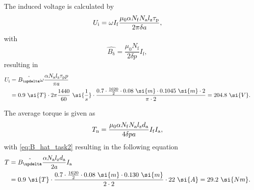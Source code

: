 
\begin{solutionblock}
    The induced voltage is calculated by
    \begin{equation}
        U_{\mathrm{i}} = \omega I_{\mathrm{f}} \frac{\mu_{\mathrm{0}} \alpha N_{\mathrm{f}} N_{\mathrm{a}} l_{\mathrm{z}} \tau_{\mathrm{p}}}{2 \pi \delta a},
    \end{equation}
    with
    \begin{equation}
        \hat{B_{\updelta}} = \frac{\mu_{\mathrm{0}} N_{\mathrm{f}}}{2 \delta p} I_{\mathrm{f}},
        \label{eq:B_hat_task2}
    \end{equation}
    resulting in
    \begin{align}
        \begin{split}
            U_{\mathrm{i}} &= \hat{B_{\updelta}} \omega \frac{\alpha N_{\mathrm{a}} \lz \taup p}{\pi a}\\
            &= 0.9 \ \si{T} \cdot 2\pi \frac{1440}{60} \ \si{\frac{1}{s}} \cdot \frac{0.7 \cdot \frac{1620}{2} \cdot 0.08 \ \si{m} \cdot 0.1045 \ \si{m} \cdot 2}{\pi \cdot 2}
            = 204.8 \ \si{V}.
        \end{split}
    \end{align}

    The average torque is given as
    \begin{equation}
        T_{\mathrm{n}}
        = \frac{\mu_{\mathrm{0}} \alpha N_{\mathrm{f}} N_{\mathrm{a}} l_{\mathrm{z}} d_{\mathrm{a}}}{4 \delta p a} I_{\mathrm{f}} I_{\mathrm{a}},
    \end{equation}
    with \eqref{eq:B_hat_task2} resulting in the following equation
    \begin{align}
        \begin{split}
            T &= \hat{B_{\updelta}} \frac{\alpha N_{\mathrm{a}} \lz d_{\mathrm{a}}}{2a} \Ia\\
            &= 0.9 \ \si{T} \cdot \frac{0.7 \cdot \frac{1620}{2} \cdot 0.08 \ \si{m} \cdot 0.130 \ \si{m}}{2 \cdot 2} \cdot 22 \ \si{A}
            = 29.2 \ \si{Nm}.
        \end{split}
    \end{align}


\end{solutionblock}
